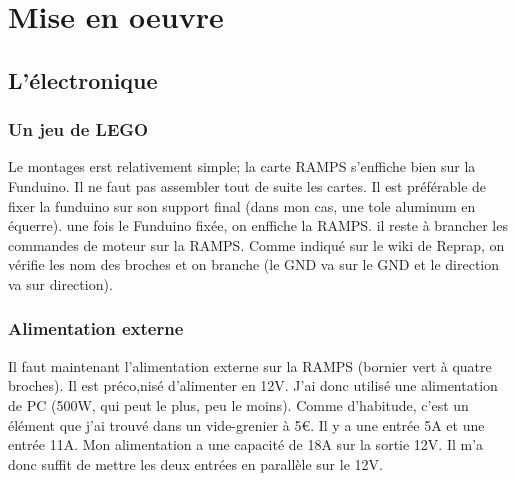 \section{Mise en oeuvre}%
\subsection{L'électronique}%
\subsubsection{Un jeu de LEGO}
Le montages erst relativement simple; la carte RAMPS s'enffiche bien sur la Funduino. %
Il ne faut pas  assembler tout de suite les cartes. Il est préférable de fixer la %
funduino sur son support final (dans mon cas, une tole aluminum en équerre). une fois %
le Funduino fixée, on enffiche  la RAMPS. il reste à brancher les commandes de moteur %
sur la RAMPS. Comme indiqué sur le wiki de Reprap, on vérifie les nom des broches et %
on branche (le GND va sur le GND et le direction va sur direction).%
\subsubsection{Alimentation externe} %
Il faut maintenant l'alimentation externe sur la RAMPS (bornier vert à quatre broches). %
Il est préco,nisé d'alimenter en 12V. J'ai donc utilisé une alimentation de PC (500W, %
qui peut le plus, peu le moins). Comme d'habitude, c'est un élément que j'ai trouvé %
dans un vide-grenier à 5\euro{}. Il y a une entrée 5A et une entrée 11A. Mon %
alimentation a une capacité de 18A sur la sortie 12V. Il m'a donc suffit de mettre %
les deux entrées en parallèle sur le 12V.%

